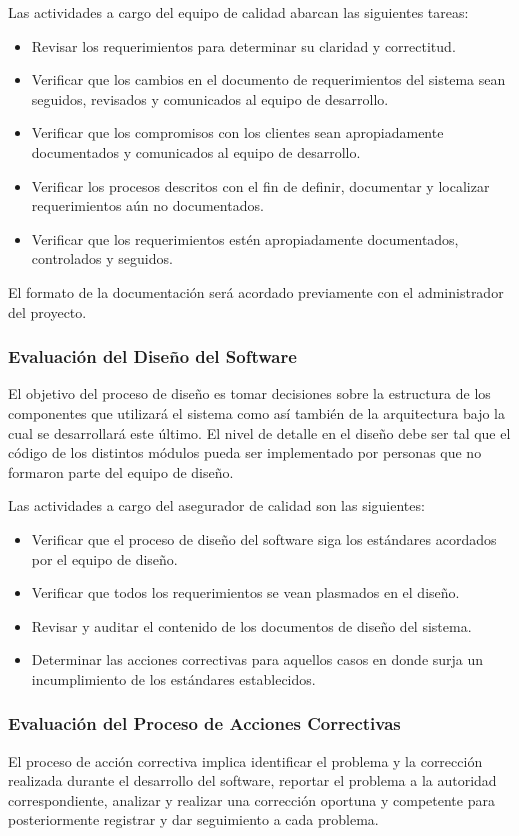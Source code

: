\documentclass[a4paper,10pt]{article}
\begin{document}
	Las actividades a cargo del equipo de calidad abarcan las siguientes tareas:
	\begin{itemize}
		\item Revisar los requerimientos para determinar su claridad y correctitud.
		\item Verificar que los cambios en el documento de requerimientos del sistema sean seguidos, revisados y comunicados al equipo de desarrollo.
		\item Verificar que los compromisos con los clientes sean apropiadamente documentados y comunicados al equipo de desarrollo.
		\item Verificar los procesos descritos con el fin de definir, documentar y localizar requerimientos aún no documentados.
		\item Verificar que los requerimientos estén apropiadamente documentados, controlados y seguidos.
	\end{itemize}
	
	El formato de la documentación será acordado previamente con el administrador del proyecto.
	
	\subsubsection{Evaluación del Diseño del Software}
	El objetivo del proceso de diseño es tomar decisiones sobre la estructura de los componentes que utilizará el sistema como así también de la arquitectura bajo la cual se desarrollará este último. El nivel de detalle en el diseño debe ser tal que el código de los distintos módulos pueda ser implementado por personas que no formaron parte del equipo de diseño.
	
	Las actividades a cargo del asegurador de calidad son las siguientes:
	\begin{itemize}
		\item Verificar que el proceso de diseño del software siga los estándares acordados por el equipo de diseño.
		\item Verificar que todos los requerimientos se vean plasmados en el diseño.
		\item Revisar y auditar el contenido de los documentos de diseño del sistema.
		\item Determinar las acciones correctivas para aquellos casos en donde surja un incumplimiento de los estándares establecidos.
	\end{itemize}
	
	\subsubsection{Evaluación del Proceso de Acciones Correctivas}
	El proceso de acción correctiva implica identificar el problema y la corrección realizada durante el desarrollo del software, reportar el problema a la autoridad correspondiente, analizar y realizar una corrección oportuna y competente para posteriormente registrar y dar seguimiento a cada problema.
	
\end{document}
